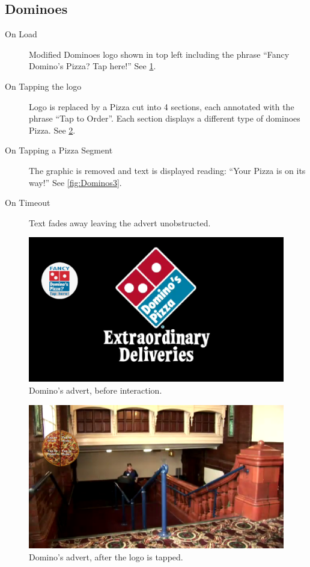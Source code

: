 \subsection{Dominoes}
	\begin{description}
		\item[On Load]{Modified Dominoes logo shown in top left including the phrase ``Fancy Domino's Pizza? Tap here!'' See \ref{fig:Dominos1}.}
		\item[On Tapping the logo]{Logo is replaced by a Pizza cut into 4 sections, each annotated with the phrase ``Tap to Order''. Each section displays a different type of dominoes Pizza. See \ref{fig:Dominos2}.}
		\item[On Tapping a Pizza Segment]{The graphic is removed and text is displayed reading: ``Your Pizza is on its way!'' See \ref{fig:Dominos3}.}
		\item[On Timeout]{Text fades away leaving the advert unobstructed.}
	\end{description}
	
	\begin{figure}[th]
		\centering
		\includegraphics[width=\textwidth,height=0.5\textheight,keepaspectratio]{images/adverts/dominos-1.png}
		\caption{Domino's advert, before interaction.}
		\label{fig:Dominos1}
	\end{figure}
	
	\begin{figure}[th]
		\centering
		\includegraphics[width=\textwidth,height=0.5\textheight,keepaspectratio]{images/adverts/dominos-2.png}
		\caption{Domino's advert, after the logo is tapped.}
		\label{fig:Dominos2}
	\end{figure}
	
